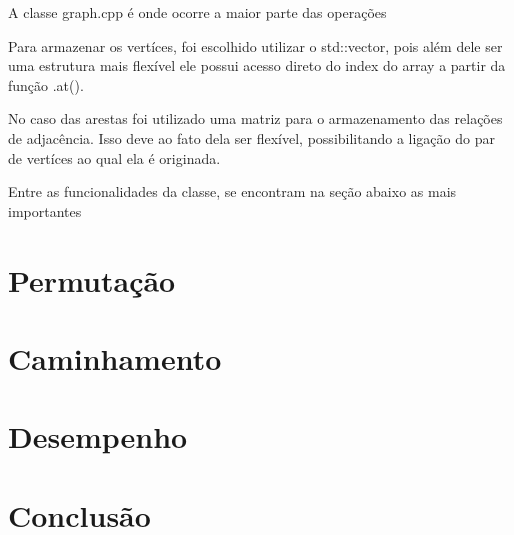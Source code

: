 \documentclass[12pt]{article}
\begin{document}
  A classe graph.cpp é onde ocorre a maior parte das operações
  
  Para armazenar os vertíces, foi escolhido utilizar o std::vector, pois além 
  dele ser uma estrutura mais flexível ele possui acesso direto do index do 
  array a partir da função .at().

  No caso das arestas foi utilizado uma matriz para o armazenamento das 
  relações de adjacência. Isso deve ao fato dela ser flexível, possibilitando
  a ligação do par de vertíces ao qual ela é originada.

  Entre as funcionalidades da classe, se encontram na seção abaixo as mais importantes

  \section{Permutação} \label{sec:permutation}

  \section{Caminhamento} \label{sec:walking}

  \section{Desempenho} \label{sec:performance}

  \section{Conclusão} \label{sec:conclusion}
\end{document}
